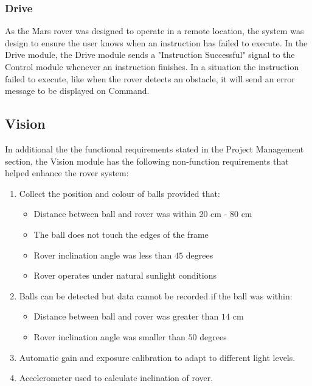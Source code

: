 \documentclass[11pt, a4paper]{article}
\begin{document}
\subsubsection{Drive}

As the Mars rover was designed to operate in a remote location, the system was design to ensure the user knows when an instruction has failed to execute. In the Drive module, the Drive module sends a "Instruction Successful" signal to the Control module whenever an instruction finishes. In a situation the instruction failed to execute, like when the rover detects an obstacle, it will send an error message to be displayed on Command.

\pagebreak
\subsection{Vision}

In additional the the functional requirements stated in the Project Management section, the Vision module has the following non-function requirements that helped enhance the rover system:
\begin{enumerate}
    \item Collect the position and colour of balls provided that:
    \begin{itemize}
        \item Distance between ball and rover was within $20$ cm - $80$ cm
        \item The ball does not touch the edges of the frame
        \item Rover inclination angle was less than $45$ degrees
        \item Rover operates under natural sunlight conditions
    \end{itemize}

    \item Balls can be detected but data cannot be recorded if the ball was within:
    \begin{itemize}
        \item Distance between ball and rover was greater than $14$ cm
        \item Rover inclination angle was smaller than $50$ degrees
    \end{itemize}

    \item Automatic gain and exposure calibration to adapt to different light levels.
    \item Accelerometer used to calculate inclination of rover.
\end{enumerate}
\end{document}
